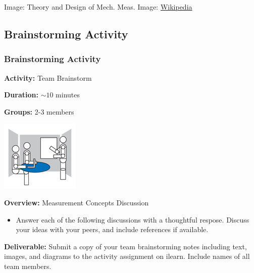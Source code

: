 \documentclass[fleqn]{beamer} %
\newcommand{\sectionIsubsectionIIItitle}{Brainstorming Activity}
\begin{document}
\begin{frame}
				{\tiny Image: Theory and Design of Mech. Meas. \hspace{20mm} Image: \href{https://en.wikipedia.org/wiki/Thermocouple}{Wikipedia} }
			\end{frame}

		\subsection{\sectionIsubsectionIIItitle}\label{sectionIsubsectionIII}
			\begin{frame} 
				\frametitle{\sectionIsubsectionIIItitle}
				
				\begin{multicols}{2}
					\scriptsize

					{\bf Activity:} Team Brainstorm

					{\bf Duration:} $\sim 10$ minutes

					{\bf Groups:} 2-3 members

					\includegraphics[scale=0.5]{images/Brainstorm_room.png}

					{\bf Overview:} Measurement Concepts Discussion
					\begin{itemize}
						\item Answer each of the following discussions with a thoughtful respose. Discuss your ideas with your peers, and include references if available.  		        
					\end{itemize}


				{\bf Deliverable:} Submit a copy of your team brainstorming notes including text, images, and diagrams to the activity assignment on ilearn. Include names of all team members.
			    \end{multicols}	
			\end{frame}
		
\end{document}
